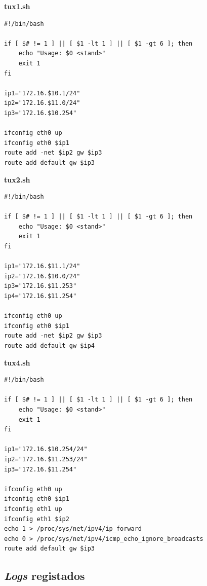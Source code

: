 \documentclass{article}
\begin{document}
\textbf{tux1.sh}
\begin{verbatim}
#!/bin/bash

if [ $# != 1 ] || [ $1 -lt 1 ] || [ $1 -gt 6 ]; then
    echo "Usage: $0 <stand>"
    exit 1
fi

ip1="172.16.$10.1/24"
ip2="172.16.$11.0/24"
ip3="172.16.$10.254"

ifconfig eth0 up
ifconfig eth0 $ip1
route add -net $ip2 gw $ip3
route add default gw $ip3
\end{verbatim}

\textbf{tux2.sh}
\begin{verbatim}
#!/bin/bash

if [ $# != 1 ] || [ $1 -lt 1 ] || [ $1 -gt 6 ]; then
    echo "Usage: $0 <stand>"
    exit 1
fi

ip1="172.16.$11.1/24"
ip2="172.16.$10.0/24"
ip3="172.16.$11.253"
ip4="172.16.$11.254"

ifconfig eth0 up
ifconfig eth0 $ip1
route add -net $ip2 gw $ip3
route add default gw $ip4
\end{verbatim}

\textbf{tux4.sh}
\begin{verbatim}
#!/bin/bash

if [ $# != 1 ] || [ $1 -lt 1 ] || [ $1 -gt 6 ]; then
    echo "Usage: $0 <stand>"
    exit 1
fi

ip1="172.16.$10.254/24"
ip2="172.16.$11.253/24"
ip3="172.16.$11.254"

ifconfig eth0 up
ifconfig eth0 $ip1
ifconfig eth1 up
ifconfig eth1 $ip2
echo 1 > /proc/sys/net/ipv4/ip_forward
echo 0 > /proc/sys/net/ipv4/icmp_echo_ignore_broadcasts
route add default gw $ip3
\end{verbatim}
\subsection{\textit{Logs} registados}
\end{document}

